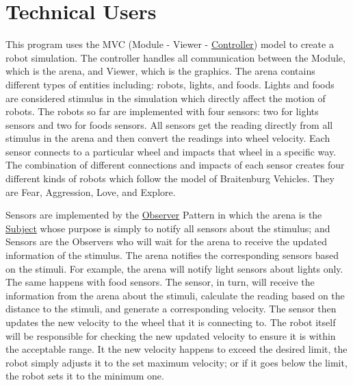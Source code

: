 \hypertarget{index_intro_sec}{}\section{Technical Users}\label{index_intro_sec}
This program uses the M\+VC (Module -\/ Viewer -\/ \hyperlink{classController}{Controller}) model to create a robot simulation. The controller handles all communication between the Module, which is the arena, and Viewer, which is the graphics. The arena contains different types of entities including\+: robots, lights, and foods. Lights and foods are considered stimulus in the simulation which directly affect the motion of robots. The robots so far are implemented with four sensors\+: two for lights sensors and two for foods sensors. All sensors get the reading directly from all stimulus in the arena and then convert the readings into wheel velocity. Each sensor connects to a particular wheel and impacts that wheel in a specific way. The combination of different connections and impacts of each sensor creates four different kinds of robots which follow the model of Braitenburg Vehicles. They are Fear, Aggression, Love, and Explore.

Sensors are implemented by the \hyperlink{classObserver}{Observer} Pattern in which the arena is the \hyperlink{classSubject}{Subject} whose purpose is simply to notify all sensors about the stimulus; and Sensors are the Observers who will wait for the arena to receive the updated information of the stimulus. The arena notifies the corresponding sensors based on the stimuli. For example, the arena will notify light sensors about lights only. The same happens with food sensors. The sensor, in turn, will receive the information from the arena about the stimuli, calculate the reading based on the distance to the stimuli, and generate a corresponding velocity. The sensor then updates the new velocity to the wheel that it is connecting to. The robot itself will be responsible for checking the new updated velocity to ensure it is within the acceptable range. It the new velocity happens to exceed the desired limit, the robot simply adjusts it to the set maximum velocity; or if it goes below the limit, the robot sets it to the minimum one.

